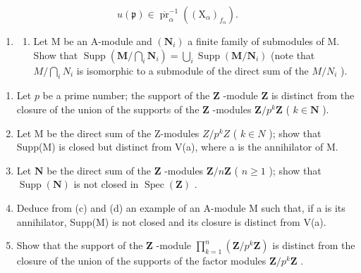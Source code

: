 \[
u (\mathfrak {p}) \in \overline {{\operatorname{pr}}} _ {\alpha} ^ {- 1} ((\mathrm{X} _ {\alpha}) _ {f _ {\alpha}}).
\]

\begin{enumerate}
\def\labelenumi{\arabic{enumi}.}
\setcounter{enumi}{21}
\tightlist
\item
  \begin{enumerate}
  \def\labelenumii{(\alph{enumii})}
  \tightlist
  \item
    Let M be an A-module and \((\mathbf{N}_{i})\) a finite family of submodules of M. Show that \(\operatorname{Supp}\left(\mathbf{M}/\bigcap_{i}\mathbf{N}_{i}\right)=\bigcup_{i}\operatorname{Supp}(\mathbf{M}/\mathbf{N}_{i})\) (note that \(M/\bigcap_{i}N_{i}\) is isomorphic to a submodule of the direct sum of the \(M/N_{i}\) ).
  \end{enumerate}
\end{enumerate}

\begin{enumerate}
\def\labelenumi{(\alph{enumi})}
\setcounter{enumi}{1}
\item
  Let \(p\) be a prime number; the support of the \(\mathbf{Z}\) -module \(\mathbf{Z}\) is distinct from the closure of the union of the supports of the \(\mathbf{Z}\) -modules \(\mathbf{Z} / p^k\mathbf{Z}\) ( \(k \in \mathbf{N}\) ).
\item
  Let M be the direct sum of the Z-modules \(Z/p^{k}Z\) ( \(k \in N\) ); show that Supp(M) is closed but distinct from V(a), where a is the annihilator of M.
\item
  Let \(\mathbf{N}\) be the direct sum of the \(\mathbf{Z}\) -modules \(\mathbf{Z} / n\mathbf{Z}\) ( \(n \geqslant 1\) ); show that \(\operatorname{Supp}(\mathbf{N})\) is not closed in \(\operatorname{Spec}(\mathbf{Z})\) .
\item
  Deduce from (c) and (d) an example of an A-module M such that, if a is its annihilator, Supp(M) is not closed and its closure is distinct from V(a).
\item
  Show that the support of the \(\mathbf{Z}\) -module \(\prod_{k=1}^{n} (\mathbf{Z}/p^k\mathbf{Z})\) is distinct from the closure of the union of the supports of the factor modules \(\mathbf{Z}/p^k\mathbf{Z}\) .
\end{enumerate}

